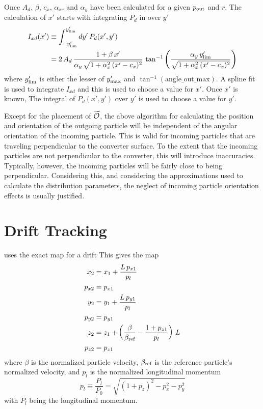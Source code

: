 Once $A_d$, $\beta$, $c_x$, $\alpha_x$, and $\alpha_y$ have been calculated for a given $p_{\text{out}}$ and
$r$, The calculation of $x'$ starts with integrating $P_d$ in  over $y'$
\begin{align} 
  I_{xd} (x') &\equiv \int_{-y'_{\text{lim}}}^{y'_{\text{lim}}} dy' \, P_d(x', y')
  \label{ixdyp} \\
  &= 2 \, A_d \, \frac{1 + \beta \, x'}{\alpha_y \, \sqrt{1 + \alpha_x^2 \, (x' - c_x)^2 }} \,
  \tan^{-1} \left( \frac{\alpha_y \, y'_{\text{lim}}}{\sqrt{1 + \alpha_x^2 \, (x' - c_x)^2}} \right)
  \nonumber
\end{align}
where $y'_{\text{lim}}$ is either the lesser of $y'_{\text{max}}$ and $\tan^{-1}(\text{angle_out_max})$.
A spline fit is used to integrate $I_{xd}$ and this is used to choose a value for $x'$. Once $x'$
is known, The integral of $P_d(x', y')$ over $y'$ is used to choose a value for $y'$.

Except for the placement of $\widetilde{{\cal O}}$, the above algorithm for calculating the position and
orientation of the outgoing particle will be independent of the angular orientation of the incoming
particle. This is valid for incoming particles that are traveling perpendicular to the converter
surface. To the extent that the incoming particles are not perpendicular to the converter, this will
introduce inaccuracies. Typically, however, the incoming particles will be fairly close to being
perpendicular. Considering this, and considering the approximations used to calculate the
distribution parameters, the neglect of incoming particle orientation effects is usually justified.

\section{Drift Tracking}
\label{s:drift.std}

\bmad uses the exact map for a drift
This gives the map
\begin{align}
  x_2    &= x_1 + \frac{L \, p_{x1}}{p_l} \nonumber \\
  p_{x2} &= p_{x1}  \nonumber \\
  y_2    &= y_1 + \frac{L \, p_{y1}}{p_l} \nonumber \\
  p_{y2} &= p_{y1}  \\
  z_2    &= z_1 + \left( \frac{\beta}{\beta_{\text{ref}}} - \frac{1 + p_{z1}}{p_l} \right) \, L \nonumber \\
  p_{z2} &= p_{z1} \nonumber
\end{align}
where $\beta$ is the normalized particle velocity, $\beta_{\text{ref}}$ is the reference particle's
normalized velocity, and $p_l$ is the normalized longitudinal momentum 
\begin{equation}
  p_l \equiv \frac{P_l}{P_0} = \sqrt{(1 + p_z)^2 - p_x^2 - p_y^2}
\end{equation}
with $P_l$ being the longitudinal momentum.

